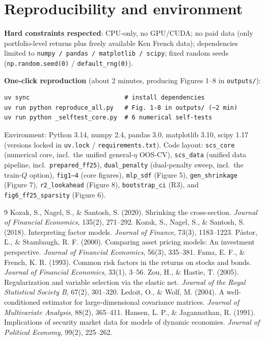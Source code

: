 \documentclass[11pt,a4paper]{article}
\begin{document}
\section{Reproducibility and environment}
\textbf{Hard constraints respected}: CPU-only, no GPU/CUDA; no paid data (only portfolio-level returns plus freely
available Ken French data); dependencies limited to \texttt{numpy / pandas / matplotlib / scipy}; fixed random
seeds (\texttt{np.random.seed(0)} / \texttt{default\_rng(0)}).

\textbf{One-click reproduction} (about 2 minutes, producing Figures 1--8 in \texttt{outputs/}):
{\small
\begin{verbatim}
uv sync                          # install dependencies
uv run python reproduce_all.py   # Fig. 1-8 in outputs/ (~2 min)
uv run python _selftest_core.py  # 6 numerical self-tests
\end{verbatim}
}
Environment: Python 3.14, numpy 2.4, pandas 3.0, matplotlib 3.10, scipy 1.17 (versions locked in \texttt{uv.lock} /
\texttt{requirements.txt}). Code layout: \texttt{scs\_core} (numerical core, incl.\ the unified general-$\eta$
OOS-CV), \texttt{scs\_data} (unified data pipeline, incl.\ \texttt{prepared\_ff25}), \texttt{dual\_penalty}
(dual-penalty sweep, incl.\ the train-$Q$ option), \texttt{fig1--4} (core figures), \texttt{mlp\_sdf} (Figure 5),
\texttt{gen\_shrinkage} (Figure 7), \texttt{r2\_lookahead} (Figure 8), \texttt{bootstrap\_ci} (R3), and
\texttt{fig6\_ff25\_sparsity} (Figure 6).

\begin{thebibliography}{9}
\small
{} Kozak, S., Nagel, S., \& Santosh, S. (2020). Shrinking the cross-section.
\emph{Journal of Financial Economics}, 135(2), 271--292.
 Kozak, S., Nagel, S., \& Santosh, S. (2018). Interpreting factor models.
\emph{Journal of Finance}, 73(3), 1183--1223.
 Pástor, \v{L}., \& Stambaugh, R. F. (2000). Comparing asset pricing models: An investment perspective.
\emph{Journal of Financial Economics}, 56(3), 335--381.
 Fama, E. F., \& French, K. R. (1993). Common risk factors in the returns on stocks and bonds.
\emph{Journal of Financial Economics}, 33(1), 3--56.
 Zou, H., \& Hastie, T. (2005). Regularization and variable selection via the elastic net.
\emph{Journal of the Royal Statistical Society B}, 67(2), 301--320.
 Ledoit, O., \& Wolf, M. (2004). A well-conditioned estimator for large-dimensional covariance matrices.
\emph{Journal of Multivariate Analysis}, 88(2), 365--411.
 Hansen, L. P., \& Jagannathan, R. (1991). Implications of security market data for models of dynamic economies.
\emph{Journal of Political Economy}, 99(2), 225--262.
\end{thebibliography}
\end{document}
